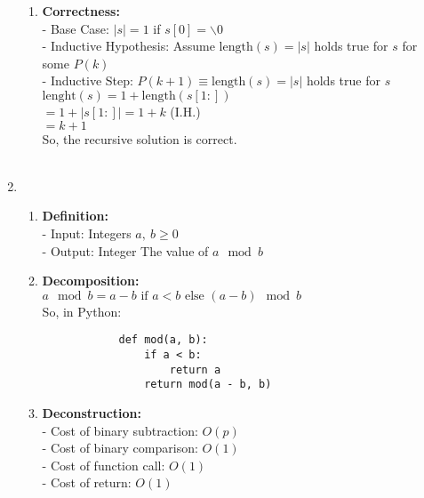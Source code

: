 \documentclass[a4paper]{article}
\begin{document}
\begin{enumerate}
\begin{enumerate}
        \item \textbf{Correctness:} \\
        - Base Case: $|s| = 1$ if $s[0] = \backslash 0$ \\
        - Inductive Hypothesis: Assume $\text{length}(s) = |s|$ holds true for $s$ for some $P(k)$ \\
        - Inductive Step: $P(k + 1) \equiv \text{length}(s) = |s|$ holds true for $s$ \\
        $\text{lenght}(s) = 1 + \text{length}(s[1:])$ \\
        $= 1 + |s[1:]| = 1 + k$ (I.H.) \\
        $= k + 1$ \\
        So, the recursive solution is correct. \\ \\
    \end{enumerate}

    \item \begin{enumerate}
        \item \textbf{Definition:} \\
        - Input: Integers $a,\ b \ge 0$ \\
        - Output: Integer The value of $a \mod b$ \\

        \item \textbf{Decomposition:} \\
        $a \mod b = a - b \text{ if } a < b \text{ else } (a - b) \mod b$ \\
        So, in Python:
        \lstset{language=Python}
        \begin{lstlisting}
            def mod(a, b):
                if a < b:
                    return a
                return mod(a - b, b)
        \end{lstlisting}

        \item \textbf{Deconstruction:} \\
        - Cost of binary subtraction: $O(p)$ \\
        - Cost of binary comparison: $O(1)$ \\
        - Cost of function call: $O(1)$ \\
        - Cost of return: $O(1)$ \\


\end{enumerate}
\end{enumerate}
\end{document}
